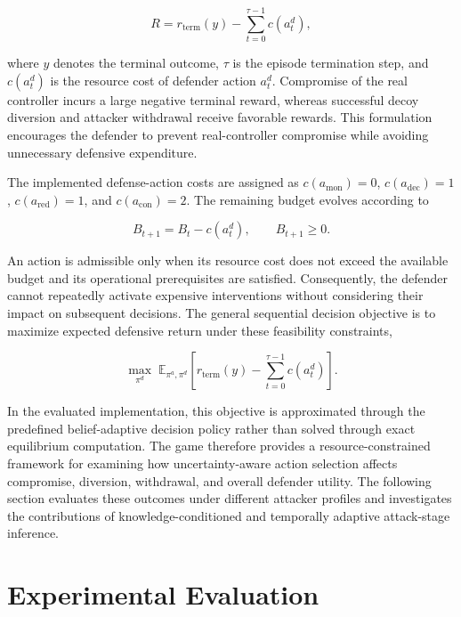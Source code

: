 \documentclass[10pt,conference]{IEEEtran}
\begin{document}
\begin{equation}
R =
r_{\mathrm{term}}(y)
-
\sum_{t=0}^{\tau-1}c(a_t^{d}),
\label{eq:episode_reward}
\end{equation}

\noindent
where $y$ denotes the terminal outcome, $\tau$ is the episode termination step, and $c(a_t^{d})$ is the resource cost of defender action $a_t^{d}$. Compromise of the real controller incurs a large negative terminal reward, whereas successful decoy diversion and attacker withdrawal receive favorable rewards. This formulation encourages the defender to prevent real-controller compromise while avoiding unnecessary defensive expenditure.

The implemented defense-action costs are assigned as $c(a_{\mathrm{mon}})=0$, $c(a_{\mathrm{dec}})=1$, $c(a_{\mathrm{red}})=1$, and $c(a_{\mathrm{con}})=2$. The remaining budget evolves according to

\begin{equation}
B_{t+1}=B_t-c(a_t^{d}),
\qquad B_{t+1}\geq 0.
\label{eq:budget_constraint}
\end{equation}

\noindent
An action is admissible only when its resource cost does not exceed the available budget and its operational prerequisites are satisfied. Consequently, the defender cannot repeatedly activate expensive interventions without considering their impact on subsequent decisions. The general sequential decision objective is to maximize expected defensive return under these feasibility constraints,

\begin{equation}
\max_{\pi^{d}}
\;\mathbb{E}_{\pi^{a},\pi^{d}}
\left[
r_{\mathrm{term}}(y)
-
\sum_{t=0}^{\tau-1}c(a_t^{d})
\right].
\label{eq:defender_objective}
\end{equation}

\noindent
In the evaluated implementation, this objective is approximated through the predefined belief-adaptive decision policy rather than solved through exact equilibrium computation. The game therefore provides a resource-constrained framework for examining how uncertainty-aware action selection affects compromise, diversion, withdrawal, and overall defender utility. The following section evaluates these outcomes under different attacker profiles and investigates the contributions of knowledge-conditioned and temporally adaptive attack-stage inference.

\section{Experimental Evaluation}
\label{sec:evaluation}
\end{document}
